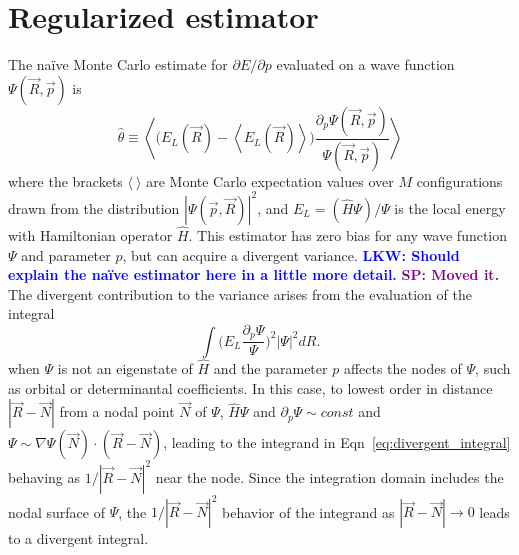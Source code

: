\documentclass[twocolumn]{revtex4-1}
\newcommand{\lucas}[1]{\textbf{\textcolor{blue}{LKW: #1}}}
\newcommand{\shivesh}[1]{\textbf{\textcolor{purple}{SP: #1}}}
\begin{document}
\section{Regularized estimator}
The na\"ive Monte Carlo estimate for $\partial E/\partial p$ evaluated on a wave function $\Psi(\vec{R}, \vec{p})$ is 
\begin{equation}
\hat{\theta} \equiv \left\langle \Big(E_L(\vec{R})  - \left\langle E_L(\vec{R}) \right \rangle\Big)\frac{\partial_p \Psi(\vec{R}, \vec{p})}{\Psi(\vec{R}, \vec{p})} \right\rangle
\label{eq:naive_estimator}
\end{equation} 
where the brackets $\langle \ \rangle$ are Monte Carlo expectation values over $M$ configurations drawn from the distribution $|\Psi(\vec{p}, \vec{R})|^2$, and $E_L = (\hat{H}\Psi)/\Psi$ is the local energy with Hamiltonian operator $\hat{H}$.
This estimator has zero bias for any wave function $\Psi$ and parameter $p$, but can acquire a divergent variance.
\lucas{Should explain the na\"ive estimator here in a little more detail.}
\shivesh{Moved it.}
The divergent contribution to the variance arises from the evaluation of the integral
\begin{equation}
\int \Big(E_L\frac{\partial_p\Psi}{\Psi}\Big)^2 |\Psi|^2 dR.
\label{eq:divergent_integral}
\end{equation}
when $\Psi$ is not an eigenstate of $\hat{H}$ and the parameter $p$ affects the nodes of $\Psi$, such as orbital or determinantal coefficients.
In this case, to lowest order in distance $|\vec{R}-\vec{N}|$ from a nodal point $\vec{N}$ of $\Psi$, $\hat{H}\Psi$ and $\partial_p \Psi \sim const$ and $\Psi \sim \nabla \Psi(\vec{N}) \cdot (\vec{R} - \vec{N})$, leading to the integrand in Eqn~\ref{eq:divergent_integral} behaving as $1/|\vec{R}-\vec{N}|^2$ near the node.
Since the integration domain includes the nodal surface of $\Psi$, the $1/|\vec{R}-\vec{N}|^2$ behavior of the integrand as $|\vec{R}-\vec{N}|\rightarrow 0$ leads to a divergent integral.
\end{document}
